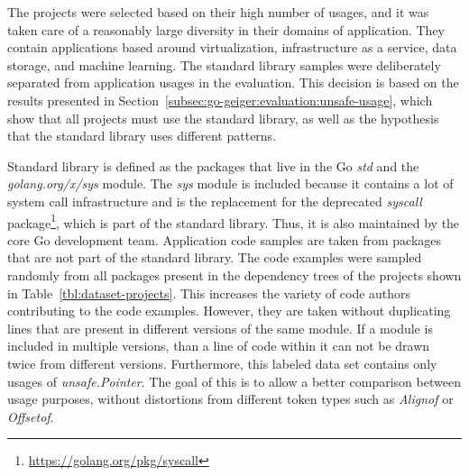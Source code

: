 

The projects were selected based on their high number of \unsafe{} usages, and it was taken care of a reasonably large
diversity in their domains of application.
They contain applications based around virtualization, infrastructure as a service, data storage, and machine learning.
The standard library samples were deliberately separated from application usages in the evaluation.
This decision is based on the results presented in Section~\ref{subsec:go-geiger:evaluation:unsafe-usage}, which show
that all projects must use the standard library, as well as the hypothesis that the standard library uses different
\unsafe{} patterns.

Standard library is defined as the packages that live in the Go \textit{std} and the \textit{golang.org/x/sys} module.
The \textit{sys} module is included because it contains a lot of system call infrastructure and is the replacement for
the deprecated \textit{syscall} package\footnote{\url{https://golang.org/pkg/syscall}}, which is part of the standard
library.
Thus, it is also maintained by the core Go development team.
Application code samples are taken from packages that are not part of the standard library.
The \numberLabeledCodeSnippets{} code examples were sampled randomly from all packages present in the dependency trees
of the projects shown in Table~\ref{tbl:dataset-projects}.
This increases the variety of code authors contributing to the code examples.
However, they are taken without duplicating lines that are present in different versions of the same module.
If a module is included in multiple versions, than a line of code within it can not be drawn twice from different
versions.
Furthermore, this labeled data set contains only usages of \textit{unsafe.Pointer}.
The goal of this is to allow a better comparison between usage purposes, without distortions from different \unsafe{}
token types such as \textit{Alignof} or \textit{Offsetof}.



